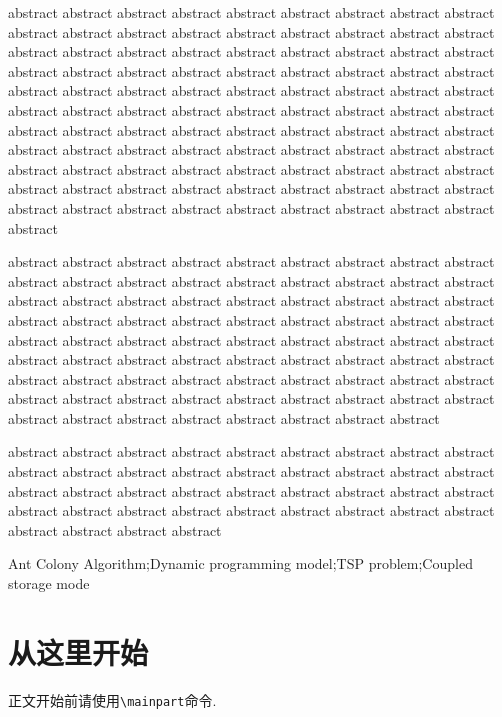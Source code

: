 \documentclass[12pt]{thesis-NJFU}
\begin{document}
\begin{enabstract}
	abstract abstract abstract abstract abstract abstract abstract abstract abstract abstract abstract abstract abstract abstract abstract abstract abstract abstract abstract abstract 
	abstract abstract abstract abstract abstract abstract abstract abstract abstract abstract abstract abstract abstract abstract abstract abstract abstract abstract abstract abstract 
	abstract abstract abstract abstract abstract abstract abstract abstract abstract abstract abstract abstract abstract abstract abstract abstract abstract abstract abstract abstract 
	abstract abstract abstract abstract abstract abstract abstract abstract abstract abstract abstract abstract abstract abstract abstract abstract abstract abstract abstract abstract 
	abstract abstract abstract abstract abstract abstract abstract abstract abstract abstract abstract abstract abstract abstract abstract abstract abstract abstract abstract abstract 

	abstract abstract abstract abstract abstract abstract abstract abstract abstract abstract abstract abstract abstract abstract abstract abstract abstract abstract abstract abstract 
	abstract abstract abstract abstract abstract abstract abstract abstract abstract abstract abstract abstract abstract abstract abstract abstract abstract abstract abstract abstract 
	abstract abstract abstract abstract abstract abstract abstract abstract abstract abstract abstract abstract abstract abstract abstract abstract abstract abstract abstract abstract 
	abstract abstract abstract abstract abstract abstract abstract abstract abstract abstract abstract abstract abstract abstract abstract abstract abstract abstract abstract abstract 

	abstract abstract abstract abstract abstract abstract abstract abstract abstract abstract abstract abstract abstract abstract abstract abstract abstract abstract abstract abstract 
	abstract abstract abstract abstract abstract abstract abstract abstract abstract abstract abstract abstract abstract abstract abstract abstract abstract abstract abstract abstract 
\begin{enkeywords}
	Ant Colony Algorithm;Dynamic programming model;TSP problem;Coupled storage mode
\end{enkeywords}
\end{enabstract}

\tableofcontents

\mainpart

\section{从这里开始}
正文开始前请使用\verb|\mainpart|命令.
\end{document}
